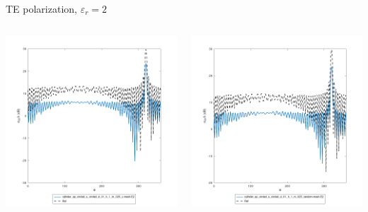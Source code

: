 \begin{frame}{TE polarization, $\varepsilon_r=2$}
\begin{columns}

\includegraphics[width=\linewidth]{results/FF/cylD_01_H_1_M_025_Z/epr2_TE.png}


\includegraphics[width=\linewidth]{results/FF/cylD_01_H_1_M_025_RANDOM/epr2_TE.png}


\end{columns}
\end{frame}
